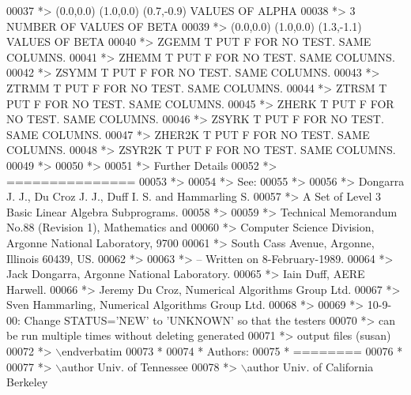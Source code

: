 \begin{DoxyCode}
00037 \textcolor{comment}{*> (0.0,0.0) (1.0,0.0) (0.7,-0.9)       VALUES OF ALPHA}
00038 \textcolor{comment}{*> 3                 NUMBER OF VALUES OF BETA}
00039 \textcolor{comment}{*> (0.0,0.0) (1.0,0.0) (1.3,-1.1)       VALUES OF BETA}
00040 \textcolor{comment}{*> ZGEMM  T PUT F FOR NO TEST. SAME COLUMNS.}
00041 \textcolor{comment}{*> ZHEMM  T PUT F FOR NO TEST. SAME COLUMNS.}
00042 \textcolor{comment}{*> ZSYMM  T PUT F FOR NO TEST. SAME COLUMNS.}
00043 \textcolor{comment}{*> ZTRMM  T PUT F FOR NO TEST. SAME COLUMNS.}
00044 \textcolor{comment}{*> ZTRSM  T PUT F FOR NO TEST. SAME COLUMNS.}
00045 \textcolor{comment}{*> ZHERK  T PUT F FOR NO TEST. SAME COLUMNS.}
00046 \textcolor{comment}{*> ZSYRK  T PUT F FOR NO TEST. SAME COLUMNS.}
00047 \textcolor{comment}{*> ZHER2K T PUT F FOR NO TEST. SAME COLUMNS.}
00048 \textcolor{comment}{*> ZSYR2K T PUT F FOR NO TEST. SAME COLUMNS.}
00049 \textcolor{comment}{*>}
00050 \textcolor{comment}{*> }
00051 \textcolor{comment}{*> Further Details}
00052 \textcolor{comment}{*> ===============}
00053 \textcolor{comment}{*>}
00054 \textcolor{comment}{*> See:}
00055 \textcolor{comment}{*>}
00056 \textcolor{comment}{*>    Dongarra J. J., Du Croz J. J., Duff I. S. and Hammarling S.}
00057 \textcolor{comment}{*>    A Set of Level 3 Basic Linear Algebra Subprograms.}
00058 \textcolor{comment}{*>}
00059 \textcolor{comment}{*>    Technical Memorandum No.88 (Revision 1), Mathematics and}
00060 \textcolor{comment}{*>    Computer Science Division, Argonne National Laboratory, 9700}
00061 \textcolor{comment}{*>    South Cass Avenue, Argonne, Illinois 60439, US.}
00062 \textcolor{comment}{*>}
00063 \textcolor{comment}{*> -- Written on 8-February-1989.}
00064 \textcolor{comment}{*>    Jack Dongarra, Argonne National Laboratory.}
00065 \textcolor{comment}{*>    Iain Duff, AERE Harwell.}
00066 \textcolor{comment}{*>    Jeremy Du Croz, Numerical Algorithms Group Ltd.}
00067 \textcolor{comment}{*>    Sven Hammarling, Numerical Algorithms Group Ltd.}
00068 \textcolor{comment}{*>}
00069 \textcolor{comment}{*>    10-9-00:  Change STATUS='NEW' to 'UNKNOWN' so that the testers}
00070 \textcolor{comment}{*>              can be run multiple times without deleting generated}
00071 \textcolor{comment}{*>              output files (susan)}
00072 \textcolor{comment}{*> \(\backslash\)endverbatim}
00073 \textcolor{comment}{*}
00074 \textcolor{comment}{*  Authors:}
00075 \textcolor{comment}{*  ========}
00076 \textcolor{comment}{*}
00077 \textcolor{comment}{*> \(\backslash\)author Univ. of Tennessee }
00078 \textcolor{comment}{*> \(\backslash\)author Univ. of California Berkeley }

\end{DoxyCode}
